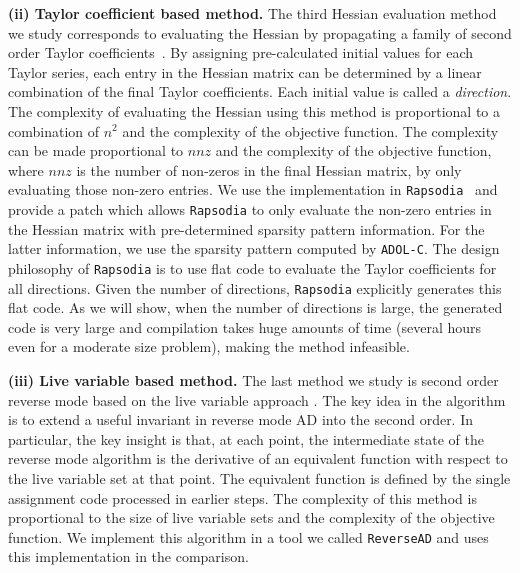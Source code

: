 \documentclass[final,leqno,onefignum,onetabnum]{siamart}
\begin{document}
{\bf (ii) Taylor coefficient based method. } 
The third Hessian evaluation method  we study  corresponds to evaluating the Hessian by propagating a family of second order Taylor coefficients~\cite{griewank2000evaluating}. 
By assigning pre-calculated initial values for each Taylor series, each entry in the Hessian matrix  can be determined by a linear combination of the final Taylor coefficients. Each initial value is called a {\em direction}.
The complexity of evaluating the Hessian using this method is proportional to a combination of $n^2$ and the complexity of the objective function. The complexity can be made proportional to $nnz$ and the complexity of the objective function, where $nnz$ is the number of non-zeros in the final Hessian matrix, by only evaluating those non-zero entries.
We use the implementation in {\tt Rapsodia}~\cite{charpentier2009fast} and provide a patch which allows {\tt Rapsodia} to only evaluate the non-zero entries in the Hessian matrix with pre-determined sparsity pattern information. For the latter information, we use the sparsity pattern computed by {\tt ADOL-C}. The design philosophy of {\tt Rapsodia} is to use flat code to evaluate the Taylor coefficients for all directions. Given the number of directions, {\tt Rapsodia} explicitly generates this flat code. As we will show, when the number of directions is large, the generated code is very large and compilation takes huge amounts of time (several hours even for a moderate size problem), making the method infeasible. 

{\bf (iii) Live variable based method. }
The last method we study is second order reverse mode based on the live variable approach \cite{wang2016capitalizing}. The key idea in the algorithm is to extend a useful invariant in reverse mode AD into the second order. In particular, the key insight is that, at each point, the intermediate state of the reverse mode algorithm is the derivative of an equivalent function with respect to the live variable set at that point. The equivalent function is defined by the single assignment code processed in earlier steps. The complexity of this method is proportional to the size of live variable sets and the complexity of the objective function. We implement this algorithm in a tool we called {\tt ReverseAD} and uses this implementation in the comparison.
\end{document}
